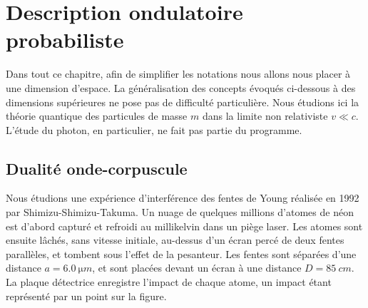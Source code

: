 \documentclass[12pt,fancy]{cours}
\begin{document}


\section{Description ondulatoire probabiliste}
\label{sec:description_proba}
Dans tout ce chapitre, afin de simplifier les notations nous allons nous placer à une dimension d'espace. La généralisation des concepts évoqués ci-dessous à des dimensions supérieures ne pose pas de difficulté particulière. Nous étudions ici la théorie quantique des particules  de masse $m$ dans la limite non relativiste $v\ll c$. L'étude du photon, en particulier, ne fait pas partie du programme. 
\subsection{Dualité onde-corpuscule}
\label{subsec:interfs}

 Nous étudions une expérience d'interférence des fentes de Young réalisée en 1992 par Shimizu-Shimizu-Takuma. Un nuage de quelques millions d’atomes de néon est d’abord capturé et refroidi au millikelvin dans
un piège laser. Les atomes sont ensuite lâchés, sans vitesse
initiale, au-dessus d’un écran percé de
deux fentes parallèles, et tombent sous l'effet de la pesanteur. Les fentes sont
séparées d'une distance $a = \SI{6,0}{\micro m}$, et sont placées devant un écran à une distance $D=\SI{85}{cm}$. La plaque détectrice enregistre l’impact de chaque atome, un impact étant représenté par un point sur la figure.
\end{document}
